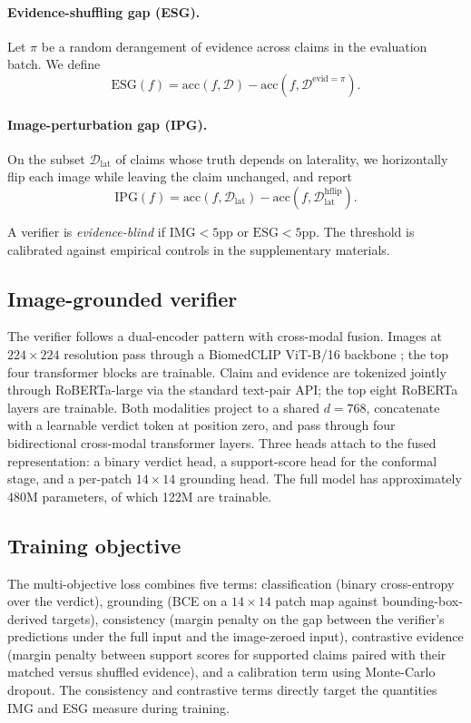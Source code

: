 \documentclass[pmlr]{jmlr}
\begin{document}
\paragraph{Evidence-shuffling gap (ESG).} Let $\pi$ be a random derangement of evidence across claims in the evaluation batch. We define
\[
\text{ESG}(f) = \text{acc}(f, \mathcal{D}) - \text{acc}(f, \mathcal{D}^{\text{evid}=\pi}).
\]

\paragraph{Image-perturbation gap (IPG).} On the subset $\mathcal{D}_{\text{lat}}$ of claims whose truth depends on laterality, we horizontally flip each image while leaving the claim unchanged, and report
\[
\text{IPG}(f) = \text{acc}(f, \mathcal{D}_{\text{lat}}) - \text{acc}(f, \mathcal{D}_{\text{lat}}^{\text{hflip}}).
\]

A verifier is \emph{evidence-blind} if $\text{IMG} < 5$pp or $\text{ESG} < 5$pp. The threshold is calibrated against empirical controls in the supplementary materials.

\subsection{Image-grounded verifier}

The verifier follows a dual-encoder pattern with cross-modal fusion. Images at $224 \times 224$ resolution pass through a BiomedCLIP ViT-B/16 backbone \citep{zhang2023biomedclip}; the top four transformer blocks are trainable. Claim and evidence are tokenized jointly through RoBERTa-large \citep{liu2019roberta} via the standard text-pair API; the top eight RoBERTa layers are trainable. Both modalities project to a shared $d = 768$, concatenate with a learnable verdict token at position zero, and pass through four bidirectional cross-modal transformer layers. Three heads attach to the fused representation: a binary verdict head, a support-score head for the conformal stage, and a per-patch $14 \times 14$ grounding head. The full model has approximately 480M parameters, of which 122M are trainable.

\subsection{Training objective}

The multi-objective loss combines five terms: classification (binary cross-entropy over the verdict), grounding (BCE on a $14 \times 14$ patch map against bounding-box-derived targets), consistency (margin penalty on the gap between the verifier's predictions under the full input and the image-zeroed input), contrastive evidence (margin penalty between support scores for supported claims paired with their matched versus shuffled evidence), and a calibration term using Monte-Carlo dropout. The consistency and contrastive terms directly target the quantities IMG and ESG measure during training.
\end{document}
